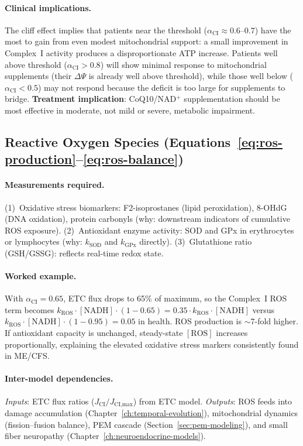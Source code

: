 \paragraph{Clinical implications.}
The cliff effect implies that patients near the threshold ($\alpha_{\text{CI}} \approx 0.6$--$0.7$) have the most to gain from even modest mitochondrial support: a small improvement in Complex~I activity produces a disproportionate ATP increase. Patients well above threshold ($\alpha_{\text{CI}} > 0.8$) will show minimal response to mitochondrial supplements (their $\Delta\Psi$ is already well above threshold), while those well below ($\alpha_{\text{CI}} < 0.5$) may not respond because the deficit is too large for supplements to bridge. \textbf{Treatment implication}: CoQ10/NAD$^+$ supplementation should be most effective in moderate, not mild or severe, metabolic impairment.

\subsection{Reactive Oxygen Species (Equations~\ref{eq:ros-production}--\ref{eq:ros-balance})}

\paragraph{Measurements required.}
(1)~Oxidative stress biomarkers: F2-isoprostanes (lipid peroxidation), 8-OHdG (DNA oxidation), protein carbonyls (why: downstream indicators of cumulative ROS exposure).
(2)~Antioxidant enzyme activity: SOD and GPx in erythrocytes or lymphocytes (why: $k_{\text{SOD}}$ and $k_{\text{GPx}}$ directly).
(3)~Glutathione ratio (GSH/GSSG): reflects real-time redox state.

\paragraph{Worked example.}
With $\alpha_{\text{CI}} = 0.65$, ETC flux drops to 65\% of maximum, so the Complex~I ROS term becomes $k_{\text{ROS}} \cdot [\text{NADH}] \cdot (1 - 0.65) = 0.35 \cdot k_{\text{ROS}} \cdot [\text{NADH}]$ versus $k_{\text{ROS}} \cdot [\text{NADH}] \cdot (1 - 0.95) = 0.05$ in health. ROS production is $\sim$7-fold higher. If antioxidant capacity is unchanged, steady-state $[\text{ROS}]$ increases proportionally, explaining the elevated oxidative stress markers consistently found in ME/CFS.

\paragraph{Inter-model dependencies.}
\emph{Inputs}: ETC flux ratios ($J_{\text{CI}}/J_{\text{CI,max}}$) from ETC model. \emph{Outputs}: ROS feeds into damage accumulation (Chapter~\ref{ch:temporal-evolution}), mitochondrial dynamics (fission--fusion balance), PEM cascade (Section~\ref{sec:pem-modeling}), and small fiber neuropathy (Chapter~\ref{ch:neuroendocrine-models}).

